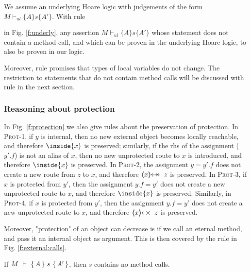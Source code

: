 We assume  an underlying Hoare logic with judgements of the form $M \vdash_{ul} \{ A \} s \{ A' \}$.
With rule {{} in Fig. \ref{f:underly},  any assertion $M \vdash_{ul} \{ A \} s \{ A' \}$  whose statement does not contain a method call, and which 
can be proven in the underlying Hoare logic, to also be proven in our logic.


Moreover, rule {} promises that types of local variables do not change. The restriction to statements that do not contain method calls will be discussed with rule {} in the next section.

 

 \subsubsection{Reasoning about protection}

{
In Fig. \ref{f:protection} we also give rules about the preservation of protection.
In \textsc{Prot-1}, if $y$ is internal, then no new external object becomes locally reachable, and therefore $ \inside{x}$ is preserved;
similarly, if the rhs of the assignment ($y'.f$) is not an alias of $x$, then no new unprotected route to $x$ is introduced, and therefore  $ \inside{x}$ is preserved.
In \textsc{Prot-2}, the assignment $y=y'.f$ does not create a new route from $z$ to $x$, and therefore  $\protectedFrom{x}{z}$ is preserved.
In \textsc{Prot-3}, if $x$ is protected from $y'$, then the assignment $y.f=y'$ does not create a new unprotected route   to $x$, and therefore  $\inside {x}$ is preserved.
Similarly, in \textsc{Prot-4}, if $x$ is protected from $y'$, then the assignment $y.f=y'$ does not create a new unprotected route  to $x$, and therefore   $\protectedFrom{x}{z}$ is preserved.
}

Moreover, "protection" of an object can decrease is if we call an eternal method, and pass it an internal object as argument. This is then covered by the rule in Fig. \ref{f:external:calls}.

\begin{lemma}
\label{l:no:meth:calls}
If ${M\ \vdash\ \{\,A\, \} \ s\  \{\,A'\, \} }$, then $s$ contains no method calls.
\end{lemma}
  


}
